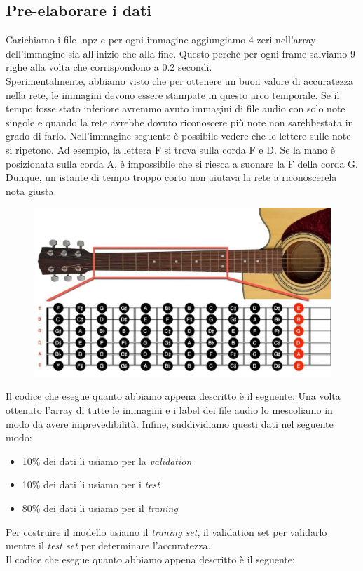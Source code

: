 \subsection{Pre-elaborare i dati}
Carichiamo i file .npz e per ogni immagine aggiungiamo 4 zeri nell'array dell'immagine sia all'inizio che alla fine. Questo perchè per ogni frame salviamo 9 righe alla volta che corrispondono a 0.2 secondi.\\
Sperimentalmente, abbiamo visto che per ottenere un buon valore di accuratezza nella rete, le immagini devono essere stampate in questo arco temporale. Se il tempo fosse stato inferiore avremmo avuto immagini di file audio con solo note singole e quando la rete avrebbe dovuto riconoscere più note non sarebbestata in grado di farlo.  Nell’immagine seguente è possibile vedere che le lettere sulle note si ripetono.  Ad esempio, la lettera F si trova sulla corda F e D. Se la mano è posizionata sulla corda A, è impossibile che si riesca a suonare la F della corda G. Dunque, un istante di tempo troppo corto non aiutava la rete a riconoscerela nota giusta.
\begin{figure}[H]
	\centering
	\includegraphics[scale=0.30]{./images/img12.jpg}
\end{figure}
Il codice che esegue quanto abbiamo appena descritto è il seguente:
\vspace*{2ex}
\vspace*{2ex}
Una volta ottenuto l'array di tutte le immagini e i label dei file audio lo mescoliamo in modo da avere imprevedibilità. Infine, suddividiamo questi dati nel seguente modo:
\begin{itemize}
	\item 10\% dei dati li usiamo per la \textit{validation}
	\item 10\% dei dati li usiamo per i \textit{test}
	\item 80\% dei dati li usiamo per il \textit{traning}
\end{itemize}
Per costruire il modello usiamo il \textit{traning set}, il validation set per validarlo mentre il \textit{test set} per determinare l'accuratezza.\\
\newline
Il codice che esegue quanto abbiamo appena descritto è il seguente:
\vspace*{2ex}
\vspace*{2ex}
